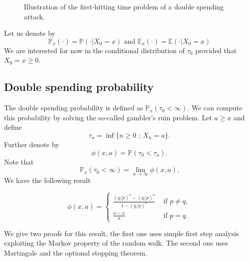 \begin{figure}[ht!]
\begin{center}
\begin{tikzpicture}
\end{tikzpicture}
\end{center}
\caption{Illustration of the first-hitting time problem of a double spending attack.}
\label{fig:double_spending_time}
\end{figure}
Let us denote by 
$$
\mathbb{P}_x(\cdot) = \mathbb{P}(\cdot|X_0 = x)\text{ and }\mathbb{E}_x(\cdot) = \mathbb{E}(\cdot|X_0 = x) 
$$
We are interested for now in the conditional distribution of ${\tau_0}$ provided that $X_0 = x\geq 0$.
\subsection{Double spending probability}\label{ssec:double_spending_rw_dsp}
The double spending probability is defined as $\mathbb{P}_x({\tau_0} <\infty)$. We can compute this probability by solving the so-called gambler's ruin problem. Let $a\geq x$ and define 
$$
\tau_a = \inf\{n\geq 0\text{ ; }X_n = a\}.
$$
Further denote by 
$$
\phi(x,a) = \mathbb{P}(\tau_0 <\tau_a).
$$
Note that 
$$
\mathbb{P}_x({\tau_0} <\infty) = \underset{a\rightarrow \infty}{\lim} \phi(x,a).
$$
We have the following result
\begin{theo}
\begin{equation}\label{eq:gambler_ruin}
\phi(x,a) = \begin{cases}
\frac{(q/p)^x-(q/p)^a}{1 - (q/p)^a}&\text{ if }p\neq q,\\
\frac{a-x}{a}&\text{ if }p= q.
\end{cases}
\end{equation}
\end{theo}
\noindent We give two proofs for this result, the first one uses simple first step analysis exploiting the Markov property of the random walk. The second one uses Martingale and the optional stopping theorem.\\

